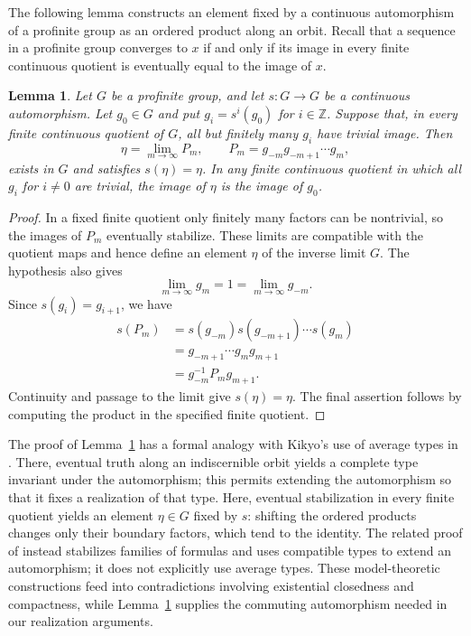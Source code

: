 \documentclass[11pt,a4paper]{amsart}
\newtheorem{lemma}[theorem]{Lemma}
\theoremstyle{definition}
\newcommand{\Z}{\mathbb Z}
\begin{document}
The following lemma constructs an element fixed by a continuous
automorphism of a profinite group as an ordered product along
an orbit. Recall that a sequence in a profinite group converges
to $x$ if and only if its image in every finite continuous quotient
is eventually equal to the image of $x$.
\begin{lemma}\label{lem:ordered-product}
Let $G$ be a profinite group, and let $s:G\to G$
be a continuous automorphism.
Let $g_0\in G$ and put $g_i=s^i(g_0)$ for $i\in\Z$.
Suppose that, in every finite continuous quotient of $G$, all but
finitely many $g_i$ have trivial image. Then
\[
\eta=\lim_{m\to\infty}P_m,
\qquad P_m=g_{-m}g_{-m+1}\cdots g_m,
\]
exists in $G$ and satisfies $s(\eta)=\eta$.
In any finite continuous quotient in which all $g_i$
for $i\ne0$ are trivial, the image of $\eta$ is the
image of $g_0$.
\end{lemma}

\begin{proof}
In a fixed finite quotient only finitely many factors can be
nontrivial, so the images of $P_m$ eventually stabilize.
These limits are compatible with the quotient maps and hence
define an element $\eta$ of the inverse limit $G$.
The hypothesis also gives
\[
\lim_{m\to\infty}g_m=1=\lim_{m\to\infty}g_{-m}.
\]
Since $s(g_i)=g_{i+1}$, we have
\[
\begin{aligned}
s(P_m)
&=s(g_{-m})s(g_{-m+1})\cdots s(g_m)\\
&=g_{-m+1}\cdots g_mg_{m+1}\\
&=g_{-m}^{-1}P_mg_{m+1}.
\end{aligned}
\]
Continuity and passage to the limit give $s(\eta)=\eta$.
The final assertion follows by computing the product in the
specified finite quotient.
\end{proof}


The proof of Lemma~\ref{lem:ordered-product} has a formal analogy
with Kikyo's use of average types in
\cite[Theorems~3.1 and~3.3]{Kikyo}. There, eventual truth along
an indiscernible orbit yields
a complete type invariant under the automorphism; this permits
extending the automorphism so that it fixes a realization of
that type. Here, eventual stabilization in every finite quotient
yields an element $\eta\in G$ fixed by $s$:
shifting the ordered products changes only their boundary factors,
which tend to the identity. The related proof of
\cite[Theorem~1]{KikyoShelah} instead stabilizes families of
formulas and uses compatible types to extend an automorphism;
it does not explicitly use average types. These model-theoretic
constructions feed into contradictions involving existential
closedness and compactness, while Lemma~\ref{lem:ordered-product}
supplies the commuting automorphism needed in our realization
arguments.
\end{document}

